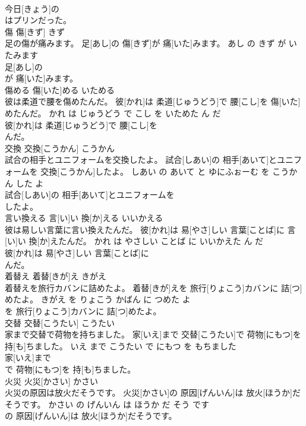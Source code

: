 \documentclass[8pt]{extreport}
\begin{document}
\begin{CJK}{UTF8}{min}
\\	今日[きょう]の
\\	はプリンだった。			
\\	傷	傷[きず]	きず	
\\	足の傷が痛みます。	足[あし]の 傷[きず]が 痛[いた]みます。	あし の きず が いたみます	
\\	足[あし]の
\\	が 痛[いた]みます。			
\\	傷める	傷[いた]める	いためる	
\\	彼は柔道で腰を傷めたんだ。	彼[かれ]は 柔道[じゅうどう]で 腰[こし]を 傷[いた]めたんだ。	かれ は じゅうどう で こし を いためた ん だ	
\\	彼[かれ]は 柔道[じゅうどう]で 腰[こし]を
\\	んだ。			
\\	交換	交換[こうかん]	こうかん	
\\	試合の相手とユニフォームを交換したよ。	試合[しあい]の 相手[あいて]とユニフォームを 交換[こうかん]したよ。	しあい の あいて と ゆにふぉーむ を こうかん した よ	
\\	試合[しあい]の 相手[あいて]とユニフォームを
\\	したよ。			
\\	言い換える	言[い]い 換[か]える	いいかえる	
\\	彼は易しい言葉に言い換えたんだ。	彼[かれ]は 易[やさ]しい 言葉[ことば]に 言[い]い 換[か]えたんだ。	かれ は やさしい ことば に いいかえた ん だ	
\\	彼[かれ]は 易[やさ]しい 言葉[ことば]に
\\	んだ。			
\\	着替え	着替[きが]え	きがえ	
\\	着替えを旅行カバンに詰めたよ。	着替[きが]えを 旅行[りょこう]カバンに 詰[つ]めたよ。	きがえ を りょこう かばん に つめた よ	
\\	を 旅行[りょこう]カバンに 詰[つ]めたよ。			
\\	交替	交替[こうたい]	こうたい	
\\	家まで交替で荷物を持ちました。	家[いえ]まで 交替[こうたい]で 荷物[にもつ]を 持[も]ちました。	いえ まで こうたい で にもつ を もちました	
\\	家[いえ]まで
\\	で 荷物[にもつ]を 持[も]ちました。			
\\	火災	火災[かさい]	かさい	
\\	火災の原因は放火だそうです。	火災[かさい]の 原因[げんいん]は 放火[ほうか]だそうです。	かさい の げんいん は ほうか だ そう です	
\\	の 原因[げんいん]は 放火[ほうか]だそうです。			

\end{CJK}
\end{document}
